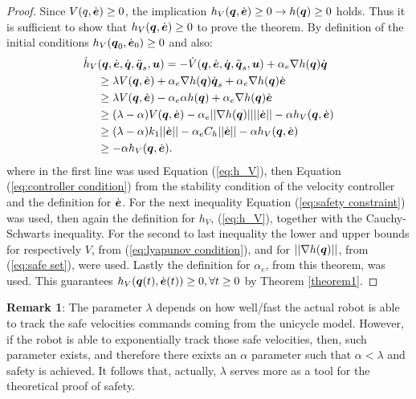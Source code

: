 \begin{proof}
    Since $V(q,\dot{\boldsymbol{e}}) \geq 0$, the implication $h_V({\boldsymbol{q}},\dot{\boldsymbol{e}}) \geq 0 \rightarrow h({\boldsymbol{q}}) \geq 0$ holds. Thus it is sufficient to show that $h_V({\boldsymbol{q}},\dot{\boldsymbol{e}}) \geq 0$ to prove the theorem. By definition of the initial conditions $h_V({\boldsymbol{q}}_0,\dot{\boldsymbol{e}}_0) \geq 0$ and also:
    \begin{equation*}
        \begin{split}
            \dot{h}_V&({\boldsymbol{q}},\dot{\boldsymbol{e}},\dot{{\boldsymbol{q}}},\ddot{{\boldsymbol{q}}}_s,\boldsymbol{u}) = -\dot{V}({\boldsymbol{q}},\dot{\boldsymbol{e}},\dot{{\boldsymbol{q}}},\ddot{{\boldsymbol{q}}}_s,\boldsymbol{u}) + \alpha_e \nabla h({\boldsymbol{q}})\dot{{\boldsymbol{q}}} \\
            & \geq \lambda V({\boldsymbol{q}},\dot{\boldsymbol{e}}) + \alpha_e \nabla h({\boldsymbol{q}})\dot{{\boldsymbol{q}}}_s + \alpha_e \nabla h({\boldsymbol{q}}) \dot{\boldsymbol{e}} \\
            & \geq \lambda V({\boldsymbol{q}},\dot{\boldsymbol{e}})  - \alpha_e \alpha h({\boldsymbol{q}}) + \alpha_e \nabla h({\boldsymbol{q}}) \dot{\boldsymbol{e}} \\
            & \geq (\lambda-\alpha) V({\boldsymbol{q}},\dot{\boldsymbol{e}}) - \alpha_e ||\nabla h({\boldsymbol{q}})|| ||\dot{\boldsymbol{e}}|| - \alpha h_V({\boldsymbol{q}},\dot{\boldsymbol{e}}) \\
            & \geq (\lambda-\alpha) k_1 ||\dot{\boldsymbol{e}}|| - \alpha_e C_h ||\dot{\boldsymbol{e}}|| - \alpha h_V({\boldsymbol{q}},\dot{\boldsymbol{e}}) \\
            & \geq - \alpha h_V({\boldsymbol{q}},\dot{\boldsymbol{e}}).
        \end{split}
    \end{equation*}
    where in the first line was used Equation (\ref{eq:h_V}), then Equation (\ref{eq:controller condition}) from the stability condition of the velocity controller and the definition for $\dot{\boldsymbol{e}}$. For the next inequality Equation (\ref{eq:safety constraint}) was used, then again the definition for $h_V$, (\ref{eq:h_V}), together with the Cauchy-Schwarts inequality. For the second to last inequality the lower and upper bounds for respectively $V$, from (\ref{eq:lyapunov condition}), and for $||\nabla h({\boldsymbol{q}})||$, from (\ref{eq:safe set}), were used. Lastly the definition for $\alpha_e$, from this theorem, was used. This guarantees $h_V({\boldsymbol{q}}(t),\dot{\boldsymbol{e}}(t)) \geq 0, \forall t \geq 0$ by Theorem \ref{theorem1}.
\end{proof}
\textbf{Remark 1}: The parameter $\lambda$ depends on how well/fast the actual robot is able to track the safe velocities commands coming from the unicycle model. However, if the robot is able to exponentially track those safe velocities, then, such parameter exists, and therefore there exixts an $\alpha$ parameter such that $\alpha <\lambda$ and safety is achieved. It follows that, actually, $\lambda$ serves more as a tool for the theoretical proof of safety.\\ 
